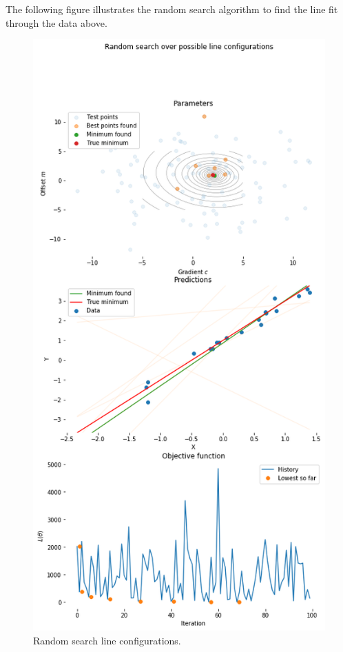 \documentclass[a4paper, openany]{memoir}
\begin{document}
The following figure illustrates the random search algorithm to find the line fit through the data above.
\begin{figure}[H]
    \centering
    \includegraphics[scale=0.5]{src/4.15 random search line configurations.png}
    \caption{Random search line configurations.}
\end{figure}
\newpage
\end{document}
